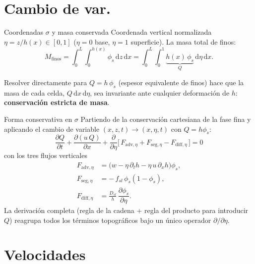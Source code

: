 \documentclass[11pt]{beamer}
\newcommand{\dd}{\mathrm{d}}
\newcommand{\pd}[2]{\dfrac{\partial #1}{\partial #2}}
\begin{document}
\section{Cambio de var.}

\begin{frame}{Coordenadas $\sigma$ y masa conservada}
Coordenada vertical normalizada $\eta = z/h(x)\in[0,1]$ ($\eta=0$ base, $\eta=1$ superficie). La masa total de finos:
\begin{equation*}
    M_{\mathrm{finos}} = \int_0^L\!\!\int_0^{h(x)}\!\phi_s\,\dd z\,\dd x
    = \int_0^L\!\!\int_0^1 \underbrace{h(x)\,\phi_s}_{\displaystyle Q}\,\dd\eta\,\dd x .
\end{equation*}

\vspace{6pt}
Resolver directamente para $Q=h\,\phi_s$ (espesor equivalente de finos) hace que la masa de cada celda, $Q\,\dd x\,\dd\eta$, sea invariante ante cualquier deformación de $h$: \textbf{conservación estricta de masa}.
\end{frame}

\begin{frame}{Forma conservativa en $\sigma$}
Partiendo de la conservación cartesiana de la fase fina y aplicando el cambio de variable $(x,z,t)\to(x,\eta,t)$ con $Q=h\phi_s$:
\begin{equation*}
    \boxed{\;\pd{Q}{t} + \pd{(u\,Q)}{x}
    + \pd{}{\eta}\Big[\, F_{\mathrm{adv},\eta} + F_{\mathrm{seg},\eta} - F_{\mathrm{diff},\eta} \,\Big] = 0\;}
\end{equation*}
con los tres flujos verticales
\begin{align*}
    F_{\mathrm{adv},\eta} &= \big(w-\eta\,\partial_t h-\eta\,u\,\partial_x h\big)\phi_s ,\\
    F_{\mathrm{seg},\eta} &= -\,f_{sl}\,\phi_s(1-\phi_s),\\
    F_{\mathrm{diff},\eta} &= \frac{D_{sl}}{h}\,\pd{\phi_s}{\eta}.
\end{align*}
La derivación completa (regla de la cadena + regla del producto para introducir $Q$) reagrupa todos los términos topográficos bajo un único operador $\partial/\partial\eta$.
\end{frame}

\section{Velocidades}
\end{document}
